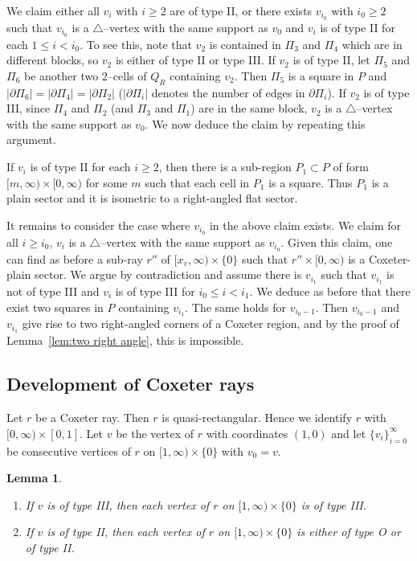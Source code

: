 \documentclass[11pt]{amsart}
\newtheorem{lemma}[theorem]{Lemma}
\theoremstyle{definition}
\begin{document}
We claim either all $v_i$ with $i\ge 2$ are of type II, or there exists $v_{i_0}$ with $i_0\ge 2$ such that $v_{i_0}$ is a $\triangle$--vertex with the same support as $v_0$ and $v_i$ is of type II for each $1\le i<i_0$. To see this, note that $v_2$ is contained in $\Pi_3$ and $\Pi_4$ which are in different blocks, so $v_2$ is either of type II or type III. If $v_2$ is of type II, let $\Pi_5$ and $\Pi_6$ be another two $2$--cells of $Q_R$ containing $v_2$. Then $\Pi_5$ is a square in $P$ and $|\partial\Pi_6|=|\partial\Pi_4|=|\partial\Pi_2|$ ($|\partial\Pi_i|$ denotes the number of edges in $\partial\Pi_i$). If $v_2$ is of type III, since $\Pi_4$ and $\Pi_2$ (and $\Pi_3$ and $\Pi_1$) are in the same block, $v_2$ is a $\triangle$--vertex with the same support as $v_0$. We now deduce the claim by repeating this argument. 

If $v_i$ is of type II for each $i\ge 2$, then there is a sub-region $P_1\subset P$ of form $[m,\infty)\times[0,\infty)$ for some $m$ such that each cell in $P_1$ is a square. Thus $P_1$ is a plain sector and it is isometric to a right-angled flat sector.

It remains to consider the case where $v_{i_0}$ in the above claim exists. We claim for all $i\ge i_0$, $v_i$ is a $\triangle$--vertex with the same support as $v_{i_0}$. Given this claim, one can find as before a sub-ray $r''$ of $[x_v,\infty)\times\{0\}$ such that $r''\times [0,\infty)$ is a Coxeter-plain sector. We argue by contradiction and assume there is $v_{i_1}$ such that $v_{i_1}$ is not of type III and $v_i$ is of type III for $i_0\le i<i_1$. We deduce as before that there exist two squares in $P$ containing $v_{i_1}$. The same holds for $v_{i_0-1}$. Then $v_{i_0-1}$ and $v_{i_1}$ give rise to two right-angled corners of a Coxeter region, and by the proof of Lemma~\ref{lem:two right angle}, this is impossible.

\subsection{Development of Coxeter rays}
\label{subsec:development of Coxeter rays}
Let $r$ be a Coxeter ray. Then $r$ is quasi-rectangular. Hence we identify $r$ with $[0,\infty)\times[0,1]$. Let $v$ be the vertex of $r$ with coordinates $(1,0)$ and let $\{v_i\}_{i=0}^{\infty}$ be consecutive vertices of $r$ on $[1,\infty)\times\{0\}$ with $v_0=v$.

\begin{lemma}\
	\label{lem:II or III}
	\begin{enumerate}
		\item If $v$ is of type III, then each vertex of $r$ on $[1,\infty)\times\{0\}$ is of type III.
		\item If $v$ is of type II, then each vertex of $r$ on $[1,\infty)\times\{0\}$ is either of type O or of type II.
	\end{enumerate}
\end{lemma}
\end{document}

